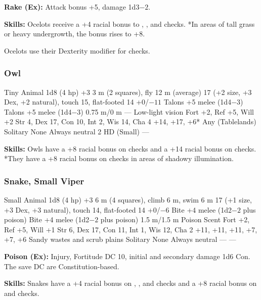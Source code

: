 \textbf{Rake (Ex):} Attack bonus +5, damage 1d3$-2$.

\textbf{Skills:} Ocelots receive a +4 racial bonus to , , and  checks. *In areas of tall grass or heavy undergrowth, the  bonus rises to +8.

Ocelots use their Dexterity modifier for  checks.

\subsubsection{Owl}
\begin{MonsterStats}
{Tiny Animal}
{1d8 (4 hp)}
{+3}
{3 m (2 squares), fly 12 m (average)}
{17 (+2 size, +3 Dex, +2 natural), touch 15, flat-footed 14}
{+0/$-11$}
{Talons +5 melee (1d4$-3$)}
{Talons +5 melee (1d4$-3$)}
{0.75 m/0 m}
{---}
{Low-light vision}
{Fort +2, Ref +5, Will +2}
{Str 4, Dex 17, Con 10, Int 2, Wis 14, Cha 4}
{ +14,  +17,  +6*}
{}
{Any (Tablelands)}
{Solitary}
{\onequarter}
{None}
{Always neutral}
{2 HD (Small)}
{---}
\end{MonsterStats}

\textbf{Skills:} Owls have a +8 racial bonus on  checks and a +14 racial bonus on  checks. *They have a +8 racial bonus on  checks in areas of shadowy illumination.

\subsubsection{Snake, Small Viper}
\begin{MonsterStats}
{Small Animal}
{1d8 (4 hp)}
{+3}
{6 m (4 squares), climb 6 m, swim 6 m}
{17 (+1 size, +3 Dex, +3 natural), touch 14, flat-footed 14}
{+0/$-6$}
{Bite +4 melee (1d2$-2$ plus poison)}
{Bite +4 melee (1d2$-2$ plus poison)}
{1.5 m/1.5 m}
{Poison}
{Scent}
{Fort +2, Ref +5, Will +1}
{Str 6, Dex 17, Con 11, Int 1, Wis 12, Cha 2}
{ +11,  +11,  +11,  +7,  +7,  +6}
{}
{Sandy wastes and scrub plains}
{Solitary}
{\onehalf}
{None}
{Always neutral}
{---}
{---}
\end{MonsterStats}

\textbf{Poison (Ex):} Injury, Fortitude DC 10, initial and secondary damage 1d6 Con. The save DC are Constitution-based.

\textbf{Skills:} Snakes have a +4 racial bonus on , , and  checks and a +8 racial bonus on  and  checks.

